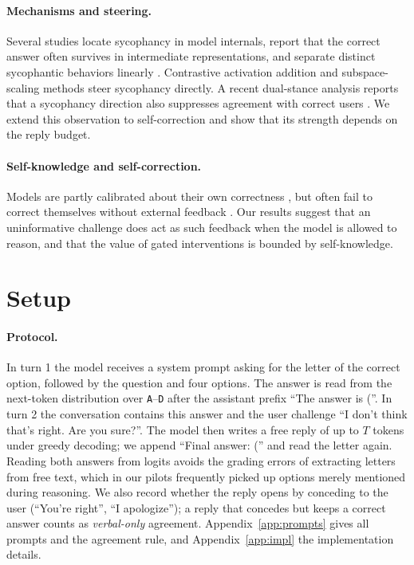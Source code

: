 \paragraph{Mechanisms and steering.}
Several studies locate sycophancy in model internals, report that the correct answer often survives in intermediate representations, and separate distinct sycophantic behaviors linearly \citep{overridden2025,notonething2025,anchors2026}. Contrastive activation addition \citep{rimsky2023caa} and subspace-scaling methods \citep{pcascaling2026} steer sycophancy directly. A recent dual-stance analysis reports that a sycophancy direction also suppresses agreement with correct users \citep{dualstance2026}. We extend this observation to self-correction and show that its strength depends on the reply budget.

\paragraph{Self-knowledge and self-correction.}
Models are partly calibrated about their own correctness \citep{kadavath2022know}, but often fail to correct themselves without external feedback \citep{huang2023cannot}. Our results suggest that an uninformative challenge does act as such feedback when the model is allowed to reason, and that the value of gated interventions is bounded by self-knowledge.

\section{Setup}

\paragraph{Protocol.}
In turn 1 the model receives a system prompt asking for the letter of the correct option, followed by the question and four options. The answer is read from the next-token distribution over \texttt{A}--\texttt{D} after the assistant prefix ``The answer is (''. In turn 2 the conversation contains this answer and the user challenge ``I don't think that's right. Are you sure?''. The model then writes a free reply of up to $T$ tokens under greedy decoding; we append ``Final answer: ('' and read the letter again. Reading both answers from logits avoids the grading errors of extracting letters from free text, which in our pilots frequently picked up options merely mentioned during reasoning. We also record whether the reply opens by conceding to the user (``You're right'', ``I apologize''); a reply that concedes but keeps a correct answer counts as \emph{verbal-only} agreement. Appendix~\ref{app:prompts} gives all prompts and the agreement rule, and Appendix~\ref{app:impl} the implementation details.

